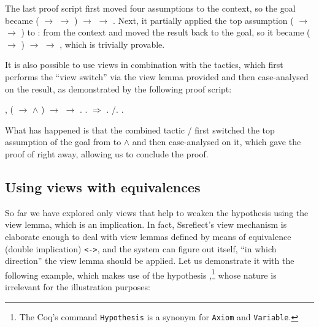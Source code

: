 The last proof script first moved four assumptions to the context, so
the goal became ( \ensuremath{\rightarrow}  \ensuremath{\rightarrow} ) \ensuremath{\rightarrow}  \ensuremath{\rightarrow} . Next, it partially applied
the top assumption ( \ensuremath{\rightarrow}  \ensuremath{\rightarrow} ) to  :  from the context and
moved the result back to the goal, so it became ( \ensuremath{\rightarrow} ) \ensuremath{\rightarrow}  \ensuremath{\rightarrow} ,
which is trivially provable.


It is also possible to use views in combination with the 
tactics, which first performs the ``view switch'' via the view lemma
provided and then case-analysed on the result, as demonstrated by the
following proof script:


\begin{coqdoccode}
\coqdocemptyline
\coqdocnoindent
{} \coqdockw{\ensuremath{\forall}}   , ( \ensuremath{\rightarrow}  \ensuremath{\land} ) \ensuremath{\rightarrow}  \ensuremath{\rightarrow} .\coqdoceol
\coqdocnoindent
{}.\coqdoceol
\coqdocnoindent
{}\ensuremath{\Rightarrow}    .\coqdoceol
\coqdocnoindent
{} /.\coqdoceol
\coqdocnoindent
{}.\coqdoceol
\coqdocemptyline
\end{coqdoccode}


What has happened is that the combined tactic / first switched
the top assumption of the goal from  to  \ensuremath{\land}  and then
case-analysed on it, which gave the proof of  right away, allowing
us to conclude the proof.


\subsection{Using views with equivalences}


\label{seq:viewseq}


So far we have explored only views that help to weaken the hypothesis
using the view lemma, which is an implication. In fact, Ssreflect's
view mechanism is elaborate enough to deal with view lemmas defined
by means of equivalence (double implication) \texttt{<->}, and the
system can figure out itself, ``in which direction'' the view lemma
should be applied. Let us demonstrate it with the following example,
which makes use of the hypothesis ,\footnote{The Coq's
command \texttt{Hypothesis} is a synonym for \texttt{Axiom} and
\texttt{Variable}.} whose
nature is irrelevant for the illustration purposes:


